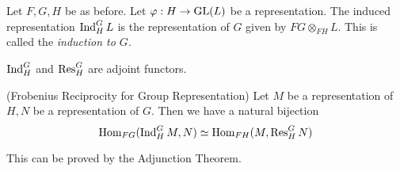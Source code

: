 \documentclass{article}
\begin{document}
\begin{definition}
  Let \(F, G, H\) be as before.
  Let \(\varphi: H \to \textnormal{GL}(L)\) be a representation.
  The induced representation \(\operatorname{Ind}_H^G L\) is the representation of \(G\)
  given by \(FG \otimes_{FH} L\).
  This is called the \emph{induction to \(G\)}.
\end{definition}

\begin{theorem}
  \(\operatorname{Ind}_H^G\) and \(\operatorname{Res}_H^G\) are adjoint functors.
\end{theorem}

\begin{theorem}(Frobenius Reciprocity for Group Representation)
  Let \(M\) be a representation of \(H, N\) be a representation of \(G\).
  Then we have a natural bijection
  \[\textnormal{Hom}_{FG}(\operatorname{Ind}_H^G M, N) \simeq \textnormal{Hom}_{FH}(M, \operatorname{Res}_H^G N)\]
\end{theorem}

This can be proved by the Adjunction Theorem.

\end{document}
